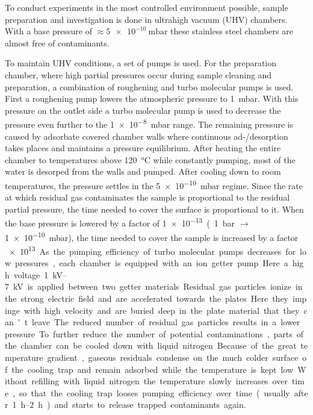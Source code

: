 To conduct experiments in the most controlled environment possible, sample preparation and investigation is done in ultrahigh vacuum (UHV) chambers. With a base pressure of $\approx \SI{5e-10}{\milli \bar}$ these stainless steel chambers are almost free of contaminants. 

To maintain UHV conditions, a set of pumps is used. For the preparation chamber, where high partial pressures occur during sample cleaning and preparation, a combination of roughening and turbo molecular pumps is used. First a roughening pump lowers the atmospheric pressure to \SI{1}{\milli \bar}. With this pressure on the outlet side a turbo molecular pump is used to decrease the pressure even further to the  \SI{1e-8}{\milli \bar} range. The remaining pressure is caused by adsorbate covered chamber walls where continuous ad-/desorption takes places and maintains a pressure equilibrium. After heating the entire chamber to temperatures above \SI{120}{\celsius} while constantly pumping, most of the water is desorped from the walls and pumped. After cooling down to room temperatures, the pressure settles in the \SI{5e-10}{\milli \bar} regime. Since the rate at which residual gas contaminates the sample is proportional to the residual partial pressure, the time needed to cover the surface is proportional to it. When the base pressure is lowered by a factor of \SI{1e-13} (\SI{1}{\bar} $\rightarrow$ \SI{1e-10}{\milli \bar}), the time needed to cover the sample is increased by a factor \SI{e13}. 

As the pumping efficiency of turbo molecular pumps decreases for low pressures, each chamber is equipped with an ion getter pump. Here a high voltage \SIrange{1}{7}{\kilo \volt} is applied between two getter materials. Residual gas particles ionize in the strong electric field and are accelerated towards the plates. Here they impinge with high velocity and are buried deep in the plate material that they can't leave. The reduced number of residual gas particles results in a lower pressure.

To further reduce the number of potential contaminations, parts of the chamber can be cooled down with liquid nitrogen. Because of the great temperature gradient, gaseous residuals condense on the much colder surface of the cooling trap and remain adsorbed while the temperature is kept low. Without refilling with liquid nitrogen the temperature slowly increases over time, so that the cooling trap looses pumping efficiency over time (usually after \SIrange{1}{2}{\hour}) and starts to release trapped contaminants again.

